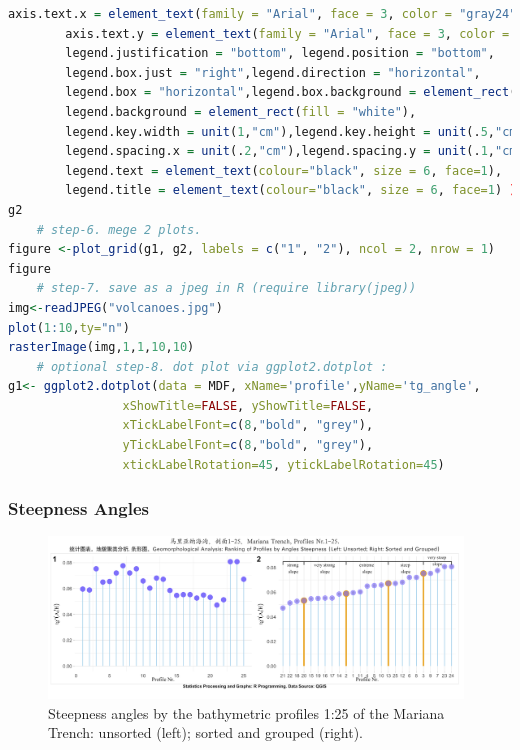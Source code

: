 \documentclass[pdflatex,compress,10pt,
	xcolor={dvipsnames,dvipsnames,svgnames,x11names,table},
	hyperref={colorlinks = true,breaklinks = true, urlcolor = NavyBlue, breaklinks = true}]{beamer}
\begin{document}
\begin{frame}[fragile,shrink=20,]
\begin{lstlisting}[language=R]
		axis.text.x = element_text(family = "Arial", face = 3, color = "gray24",size = 8, angle = 15),
    	axis.text.y = element_text(family = "Arial", face = 3, color = "gray24",size = 8, angle = 90),
		legend.justification = "bottom", legend.position = "bottom",
		legend.box.just = "right",legend.direction = "horizontal",
		legend.box = "horizontal",legend.box.background = element_rect(colour = "honeydew4",size=0.2),
		legend.background = element_rect(fill = "white"),
		legend.key.width = unit(1,"cm"),legend.key.height = unit(.5,"cm"),
		legend.spacing.x = unit(.2,"cm"),legend.spacing.y = unit(.1,"cm"),
		legend.text = element_text(colour="black", size = 6, face=1),
		legend.title = element_text(colour="black", size = 6, face=1) )
g2
	# step-6. mege 2 plots. 
figure <-plot_grid(g1, g2, labels = c("1", "2"), ncol = 2, nrow = 1)
figure
	# step-7. save as a jpeg in R (require library(jpeg))
img<-readJPEG("volcanoes.jpg")
plot(1:10,ty="n")
rasterImage(img,1,1,10,10)
	# optional step-8. dot plot via ggplot2.dotplot :
g1<- ggplot2.dotplot(data = MDF, xName='profile',yName='tg_angle',
                xShowTitle=FALSE, yShowTitle=FALSE,
                xTickLabelFont=c(8,"bold", "grey"),
                yTickLabelFont=c(8,"bold", "grey"),
                xtickLabelRotation=45, ytickLabelRotation=45)
\end{lstlisting}
\end{frame}

\begin{frame}\frametitle{Steepness Angles}
\begin{figure}[H]
	\centering
		\includegraphics[width=11cm]{Fig-3-9.jpg}
	\caption{Steepness angles by the bathymetric profiles 1:25 of the Mariana Trench: unsorted (left); sorted and grouped (right).}
\end{figure}		
\end{frame}
\end{document}

